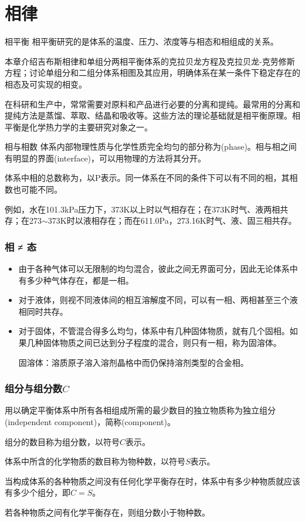 \section{相律}


\begin{frame}{相平衡}
    相平衡研究的是体系的温度、压力、浓度等与相态和相组成的关系。
    
    本章介绍吉布斯相律和单组分两相平衡体系的克拉贝龙方程及克拉贝龙-克劳修斯方程；讨论单组分和二组分体系相图及其应用，明确体系在某一条件下稳定存在的相态及可实现的相变。
    
    在科研和生产中，常常需要对原料和产品进行必要的分离和提纯。最常用的分离和提纯方法是蒸馏、萃取、结晶和吸收等。这些方法的理论基础就是相平衡原理。相平衡是化学热力学的主要研究对象之一。
\end{frame}


\begin{frame}{相与相数}
    体系内部物理性质与化学性质完全均匀的部分称为(phase)。相与相之间有明显的界面(interface)，可以用物理的方法将其分开。
    
    体系中相的总数称为，以P表示。同一体系在不同的条件下可以有不同的相，其相数也可能不同。
    
    例如，水在101.3kPa压力下，373K以上时以气相存在；在373K时气、液两相共存；在273$\sim$373K时以液相存在；而在611.0Pa，273.16K时气、液、固三相共存。
\end{frame}


\begin{frame}
    \frametitle{相 ≠ 态}
     
    \begin{itemize}
        \item[\bullet ] 由于各种气体可以无限制的均匀混合，彼此之间无界面可分，因此无论体系中有多少种气体存在，都是一相。
        \item[\bullet ] 对于液体，则视不同液体间的相互溶解度不同，可以有一相、两相甚至三个液相同时共存。
        \item[\bullet ] 对于固体，不管混合得多么均匀，体系中有几种固体物质，就有几个固相。如果几种固体物质之间已达到分子程度的混合，则只有一相，称为固溶体。
        
        固溶体：溶质原子溶入溶剂晶格中而仍保持溶剂类型的合金相。
    \end{itemize}    
\end{frame}


\begin{frame}
    \frametitle{组分与组分数$C$}

    用以确定平衡体系中所有各相组成所需的最少数目的独立物质称为独立组分(independent component)，简称(component)。
    
    组分的数目称为组分数，以符号$C$表示。
    
    体系中所含的化学物质的数目称为物种数，以符号$S$表示。
    
    当构成体系的各种物质之间没有任何化学平衡存在时，体系中有多少种物质就应该有多少个组分，即$C=S$。
    
    若各种物质之间有化学平衡存在，则组分数小于物种数。

\end{frame}



